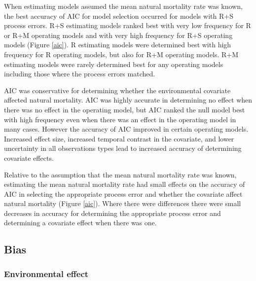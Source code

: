 \documentclass[
  12pt,
]{article}
\begin{document}
When estimating models assumed the mean natural mortality rate was known, the best accuracy of AIC for model selection occurred for models with R+S process errors. R+S estimating models ranked best with very low frequency for R or R+M operating models and with very high frequency for R+S operating models (Figure \ref{aic}). R estimating models were determined best with high frequency for R operating models, but also for R+M operating models. R+M estimating models were rarely determined best for any operating models including those where the process errors matched.

AIC was conservative for determining whether the environmental covariate affected natural mortality. AIC was highly accurate in determining no effect when there was no effect in the operating model, but AIC ranked the null model best with high frequency even when there was an effect in the operating model in many cases. However the accuracy of AIC improved in certain operating models. Increased effect size, increased temporal contrast in the covariate, and lower uncertainty in all observations types lead to increased accuracy of determining covariate effects.

Relative to the assumption that the mean natural mortality rate was known, estimating the mean natural mortality rate had small effects on the accuracy of AIC in selecting the appropriate process error and whether the covariate affect natural mortality (Figure \ref{aic}). Where there were differences there were small decreases in accuracy for determining the appropriate process error and determining a covariate effect when there was one.

\hypertarget{bias}{%
\subsection*{Bias}\label{bias}}

\hypertarget{environmental-effect}{%
\subsubsection*{Environmental effect}\label{environmental-effect}}
\end{document}
